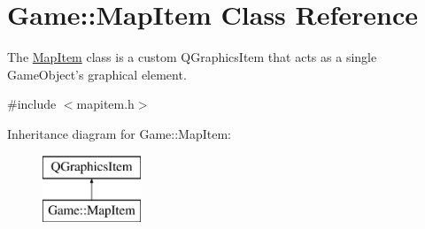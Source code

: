 \hypertarget{classGame_1_1MapItem}{\section{Game\-:\-:Map\-Item Class Reference}
\label{classGame_1_1MapItem}
}


The \hyperlink{classGame_1_1MapItem}{Map\-Item} class is a custom Q\-Graphics\-Item that acts as a single Game\-Object's graphical element.  




{\ttfamily \#include $<$mapitem.\-h$>$}

Inheritance diagram for Game\-:\-:Map\-Item\-:\begin{figure}[H]
\begin{center}
\leavevmode
\includegraphics[height=2.000000cm]{classGame_1_1MapItem}
\end{center}
\end{figure}
